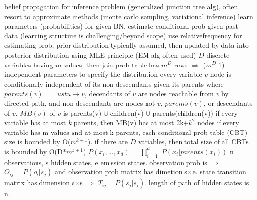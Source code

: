 \documentclass[10pt]{article}
\begin{document}
 \noindent \tiny   \setlength{\fboxsep}{0pt}






\smallbreak
{} belief propagation for inference problem (generalized junction tree alg), often resort to approximate methods (monte carlo sampling, variational inference)
\NEW    [learning] learn parameters (probabilities) for given BN, estimate conditional prob given past data (learning structure is challenging/beyond scope)
 use relativefrequency for estimating prob, prior distribution typically assumed, then updated by data into posterior distribution using MLE principle (EM alg often used)
\NEW    [complexity] $D$ discrete variables having $m$ values, then join prob table has $m^D$ rows $\Rightarrow$ ($m^D$-1) independent parameters to specify the distribution
 every variable $v$ node is conditionally independent of its non-descendants given its parents where $parents(v)$ $=$ ${u st u \rightarrow v}$, decendants of $v$ are nodes reachable from $v$ by directed path, and non-descendants are nodes not $v$, $parents(v)$, or descendants of $v$.
 $MB(v)$ of $v$ is parents(v) $\cup$ children(v) $\cup$ parents(children(v))
 if every variable has at most $k$ parents, then MB(v) has at most 2k+$k^2$ nodes
\NEW    [BN complexity] if every variable has m values and at most k parents, each conditional prob table (CBT) size is bounded by O($m^{k+1}$). if there are $D$ variables, then total size of all CBTs is bounded by O(D*$m^{k+1}$)
 $P(x_i, ..., x_d)$ = $\prod_{i=1}^d$ $P(x_i | parents(x_i))$
 n observations, s hidden states, e emission states. observation prob is $\Rightarrow$ $O_{ij} = P(o_i|s_j)$ and observation prob matrix has dimetion s$\times$e. state transition matrix has dimension s$\times$s $\Rightarrow$ $T_{ij} = P(s_j|s_i)$. length of path of hidden states is n.
\end{document}
